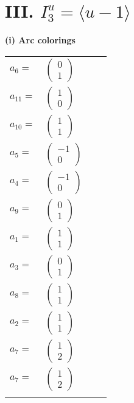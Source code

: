 \documentclass[1p]{elsarticle_modified}
\theoremstyle{definition}
\begin{document}
\centering \section*{III. $I^u_{3}= \langle u-1 \rangle$}
\flushleft \textbf{(i) Arc colorings}\\
\begin{tabular}{m{7pt} m{180pt} m{7pt} m{180pt} }
\flushright $a_{6}=$&$\begin{pmatrix}0\\1\end{pmatrix}$ \\
\flushright $a_{11}=$&$\begin{pmatrix}1\\0\end{pmatrix}$ \\
\flushright $a_{10}=$&$\begin{pmatrix}1\\1\end{pmatrix}$ \\
\flushright $a_{5}=$&$\begin{pmatrix}-1\\0\end{pmatrix}$ \\
\flushright $a_{4}=$&$\begin{pmatrix}-1\\0\end{pmatrix}$ \\
\flushright $a_{9}=$&$\begin{pmatrix}0\\1\end{pmatrix}$ \\
\flushright $a_{1}=$&$\begin{pmatrix}1\\1\end{pmatrix}$ \\
\flushright $a_{3}=$&$\begin{pmatrix}0\\1\end{pmatrix}$ \\
\flushright $a_{8}=$&$\begin{pmatrix}1\\1\end{pmatrix}$ \\
\flushright $a_{2}=$&$\begin{pmatrix}1\\1\end{pmatrix}$ \\
\flushright $a_{7}=$&$\begin{pmatrix}1\\2\end{pmatrix}$\\ \flushright $a_{7}=$&$\begin{pmatrix}1\\2\end{pmatrix}$\\&\end{tabular}
\end{document}
